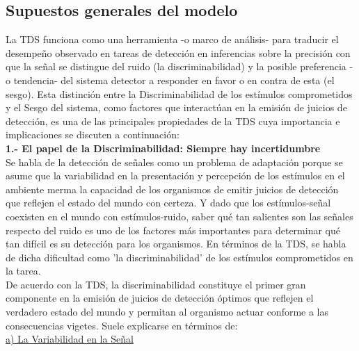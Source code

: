 \subsection{Supuestos generales del modelo}

La TDS funciona como una herramienta -o marco de análisis- para traducir el desempeño observado en tareas de detección en inferencias sobre la precisión con que la señal se distingue del ruido (la discriminabilidad) y la posible preferencia -o tendencia- del sistema detector a responder en favor o en contra de esta (el sesgo). Esta distinción entre la Discriminabilidad de los estímulos comprometidos y el Sesgo del sistema, como factores que interactúan en la emisión de juicios de detección, es una de las principales propiedades de la TDS cuya importancia e implicaciones se discuten a continuación:\\

\textbf{1.- El papel de la Discriminabilidad: Siempre hay incertidumbre}\\

Se habla de la detección de señales como un problema de adaptación porque se asume que la variabilidad en la presentación y percepción de los estímulos en el ambiente merma la capacidad de los organismos de emitir juicios de detección que reflejen el estado del mundo con certeza. Y dado que los estímulos-señal coexisten en el mundo con estímulos-ruido, saber qué tan salientes son las señales respecto del ruido es uno de los factores más importantes para determinar qué tan difícil es su detección para los organismos. En términos de la TDS, se habla de dicha dificultad como 'la discriminabilidad' de los estímulos comprometidos en la tarea.\\

De acuerdo con la TDS, la discriminabilidad constituye el primer gran componente en la emisión de juicios de detección óptimos que reflejen el verdadero estado del mundo y permitan al organismo actuar conforme a las consecuencias vigetes. Suele explicarse en términos de:\\ %

\underline{a) La Variabilidad en la Señal}\\

